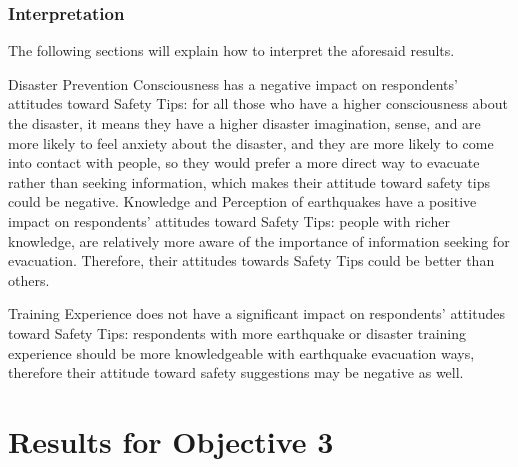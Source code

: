 \subsubsection{Interpretation}
The following sections will explain how to interpret the aforesaid results. 

Disaster Prevention Consciousness has a negative impact on respondents' attitudes toward Safety Tips: for all those who have a higher consciousness about the disaster, it means they have a higher disaster imagination, sense, and are more likely to feel anxiety about the disaster, and they are more likely to come into contact with people, so they would prefer a more direct way to evacuate rather than seeking information, which makes their attitude toward safety tips could be negative.
Knowledge and Perception of earthquakes have a positive impact on respondents' attitudes toward Safety Tips: people with richer knowledge, are relatively more aware of the importance of information seeking for evacuation. Therefore, their attitudes towards Safety Tips could be better than others.

Training Experience does not have a significant impact on respondents' attitudes toward Safety Tips: respondents with more earthquake or disaster training experience should be more knowledgeable with earthquake evacuation ways, therefore their attitude toward safety suggestions may be negative as well. 




\section{Results for Objective 3}

